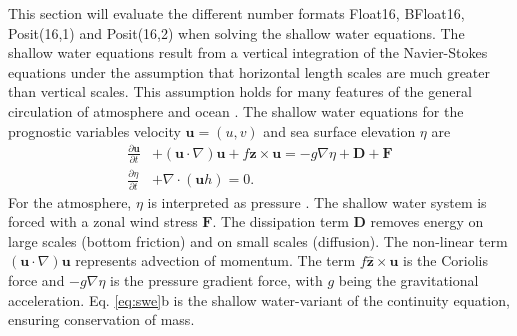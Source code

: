 \documentclass[draft]{agujournal2019}
\begin{document}
This section will evaluate the different number formats Float16, BFloat16, Posit(16,1) and Posit(16,2) when solving the shallow water equations. The shallow water equations result from a vertical integration of the Navier-Stokes equations under the assumption that horizontal length scales are much greater than vertical scales. This assumption holds for many features of the general circulation of atmosphere and ocean \cite{Gill1982,Vallis2006}. The shallow water equations for the prognostic variables velocity $\mathbf{u} = (u,v)$ and sea surface elevation $\eta$ are
\begin{subequations}
\begin{align}
\frac{\partial \mathbf{u}}{\partial t} &+ (\mathbf{u} \cdot \nabla) \mathbf{u} + f\hat{\mathbf{z}} \times \mathbf{u} = -g\nabla \eta + \mathbf{D} + \mathbf{F} \\
\frac{\partial \eta}{\partial t} &+ \nabla \cdot (\mathbf{u}h) = 0.
\end{align}
\label{eq:swe}%
\end{subequations}
For the atmosphere, $\eta$ is interpreted as pressure \cite{Gill1982}. The shallow water system is forced with a zonal wind stress $\mathbf{F}$. The dissipation term $\mathbf{D}$ removes energy on large scales (bottom friction) and on small scales (diffusion). The non-linear term $(\mathbf{u} \cdot \nabla) \mathbf{u}$ represents advection of momentum. The term $f\hat{\mathbf{z}} \times \mathbf{u}$ is the Coriolis force and $-g\nabla \eta$ is the pressure gradient force, with $g$ being the gravitational acceleration. Eq. \ref{eq:swe}b is the shallow water-variant of the continuity equation, ensuring conservation of mass.
\end{document}
